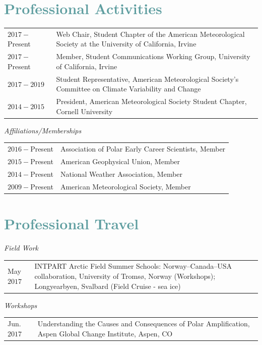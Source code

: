 \documentclass[margin,line,palatino,courier,10pt]{res}
\begin{document}
\begin{resume}
\section{\sc \textcolor{CadetBlue}{\large{Professional Activities}}}
\vspace*{0.05in}
\begin{tabular}{@{}p{0.8in}p{4in}}
$2017 - $Present & Web Chair, Student Chapter of the American Meteorological Society at the University of California, Irvine\\
$2017 - $Present & Member, Student Communications Working Group, University of California, Irvine\\
$2017-2019$ & Student Representative, American Meteorological Society's Committee on Climate Variability and Change\\
$2014-2015$ & President, American Meteorological Society Student Chapter, Cornell University\\
\end{tabular}

\textit{Affiliations/Memberships}
\vspace*{0.05in}\\
\begin{tabular}{@{}p{0.8in}p{4in}}
$2016 - $Present & Association of Polar Early Career Scientists, Member\\ 
$2015 - $Present & American Geophysical Union, Member\\
$2014 -$Present & National Weather Association, Member\\
$2009 -$Present & American Meteorological Society, Member\\
\end{tabular}

\section{\sc \textcolor{CadetBlue}{\large{Professional Travel}}}
\textit{Field Work}
\vspace*{0.05in}\\
\begin{tabular}{@{}p{0.8in}p{4in}}
May $2017$ & INTPART Arctic Field Summer Schools: Norway--Canada--USA collaboration, University of Troms\o, Norway (Workshops); Longyearbyen, Svalbard (Field Cruise - sea ice)
\end{tabular}

\textit{Workshops}
\vspace*{0.05in}\\
\begin{tabular}{@{}p{0.8in}p{4in}}
Jun. $2017$ & Understanding the Causes and Consequences of Polar Amplification, Aspen Global Change Institute, Aspen, CO
\end{tabular}


\end{resume}
\end{document}
